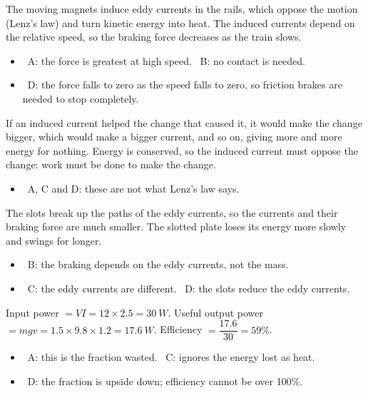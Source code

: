 \documentclass[12pt]{article}
\begin{document}
\begin{practiceanswers}
\begin{practiceans}
  The moving magnets induce eddy currents in the rails, which oppose the motion (Lenz's law) and turn
  kinetic energy into heat. The induced currents depend on the relative speed, so the braking force
  decreases as the train slows.
  \begin{itemize}
    \item \xmark\ A: the force is greatest at high speed. \quad \xmark\ B: no contact is needed.
    \item \xmark\ D: the force falls to zero as the speed falls to zero, so friction brakes are needed to
          stop completely.
  \end{itemize}
\end{practiceans}

\begin{practiceans}
  If an induced current helped the change that caused it, it would make the change bigger, which would
  make a bigger current, and so on, giving more and more energy for nothing. Energy is conserved, so the
  induced current must oppose the change: work must be done to make the change.
  \begin{itemize}
    \item \xmark\ A, C and D: these are not what Lenz's law says.
  \end{itemize}
\end{practiceans}

\begin{practiceans}
  The slots break up the paths of the eddy currents, so the currents and their braking force are much
  smaller. The slotted plate loses its energy more slowly and swings for longer.
  \begin{itemize}
    \item \xmark\ B: the braking depends on the eddy currents, not the mass.
    \item \xmark\ C: the eddy currents are different. \quad \xmark\ D: the slots reduce the eddy currents.
  \end{itemize}
\end{practiceans}

\begin{practiceans}
  Input power $= VI = 12 \times 2.5 = \qty{30}{W}$. Useful output power $= mgv = 1.5 \times 9.8 \times
  1.2 = \qty{17.6}{W}$. Efficiency $= \dfrac{17.6}{30} = 59\%$.
  \begin{itemize}
    \item \xmark\ A: this is the fraction wasted. \quad \xmark\ C: ignores the energy lost as heat.
    \item \xmark\ D: the fraction is upside down; efficiency cannot be over 100\%.
  \end{itemize}
\end{practiceans}


\end{practiceanswers}
\end{document}

